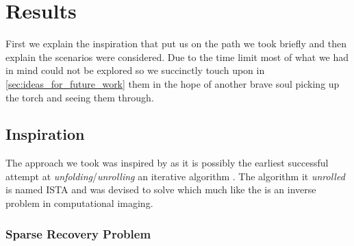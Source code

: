 \chapter{Results}\label{ch:results}

First we explain the inspiration that put us on the path we took briefly and then explain the scenarios were considered. 
Due to the time limit most of what we had in mind could not be explored so we succinctly touch upon in \cref{sec:ideas_for_future_work} them in the hope of another 
brave soul picking up the torch and seeing them through.  

\section{Inspiration}

The approach we took was inspired by \cite{Gregor2010} as it is possibly the earliest successful attempt at \emph{unfolding}/\emph{unrolling} 
an iterative algorithm \cite{Monga2019}. The algorithm it \emph{unrolled} is named \ac{ISTA}\cite{Daubechies2003} and was devised to solve \srp\index{\srp} which much like the \pr\cite{Shechtman2015}\cite{Jaganathan2015}\index{\pr} is an inverse problem\cite{Kirsch2021} in computational imaging\cite{Khare2023}.

\subsection{Sparse Recovery Problem}

